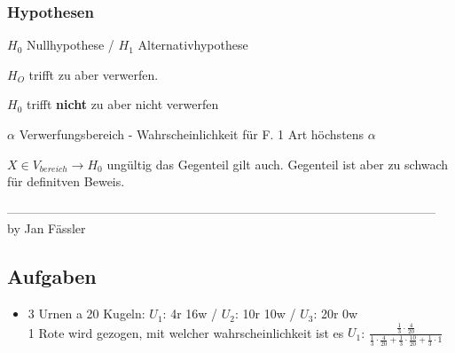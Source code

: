 \documentclass[landscape,twocolumn,a4paper]{article}
\begin{document}
\subsubsection*{Hypothesen}
\begin{description}
 \item $H_0$ Nullhypothese / $H_1$ Alternativhypothese
 \item[Fehler 1 Art:] $H_O$ trifft zu aber verwerfen.
 \item[Fehler 2 Art:] $H_0$ trifft \textbf{nicht} zu aber nicht verwerfen
 \item[Signigikanzniveau] $\alpha$ Verwerfungsbereich - Wahrscheinlichkeit für F. 1 Art höchstens $\alpha$
 \item $ X \in V_{bereich} \rightarrow H_0$ ungültig das Gegenteil gilt auch. Gegenteil ist aber zu schwach für 
definitven Beweis. 
\end{description}
--------------------------------------------------------------------------------------------------------
\\
by Jan Fässler

\pagebreak
\subsection*{Aufgaben}
\begin{itemize}
	\item 3 Urnen a 20 Kugeln: $U_1$: 4r 16w / $U_2$: 10r 10w / $U_3$: 20r 0w \\
		1 Rote wird gezogen, mit welcher wahrscheinlichkeit ist es $U_1$: $\frac{\frac{1}{3} \cdot \frac{4}{20}}{\frac{1}{3} \cdot \frac{4}{20} + \frac{1}{3} \cdot \frac{10}{20} + \frac{1}{3} \cdot 1}$
\end{itemize}
\end{document}
